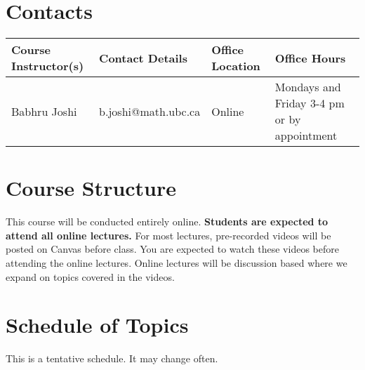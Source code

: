 \documentclass[12pt,usletter]{article} %
\begin{document}
\section*{Contacts}

\begin{tabu} to \textwidth{ | X[l] | X[l] | X[l] | X[l] | }
\hline 
{}
\textbf{Course Instructor(s)} &
\textbf{Contact Details} &
\textbf{Office Location} &
\textbf{Office Hours} \\
\hline
\relax Babhru Joshi &
\relax b.joshi@math.ubc.ca &
\relax Online &
\relax Mondays and Friday 3-4 pm or by appointment \\
%
\hline
\end{tabu}

\section*{Course Structure}

This course will be conducted entirely online. \textbf{Students are expected to attend all online lectures.} For most lectures, pre-recorded videos will be posted on Canvas before class. You are expected to watch these videos before attending the online lectures. Online lectures will be discussion based where we expand on topics covered in the videos.

\section*{Schedule of Topics}

This is a tentative schedule. It may change often.
\end{document}
